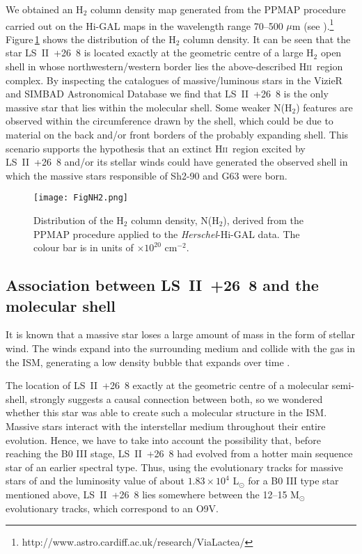 \documentclass[fleqn,usenatbib]{mnras}
\def\hii{H\textsc{ii}}
\begin{document}
We obtained an H$_{2}$ column density map generated from the PPMAP procedure carried out on the 
Hi-GAL maps in the wavelength range 70--500 $\mu$m (see 
\citealt{marsh17}).\footnote{http://www.astro.cardiff.ac.uk/research/ViaLactea/} 
Figure\,\ref{fig:NH2} shows the distribution of the H$_2$ column density. It can be
 seen that the star LS~II~+26~8 is located exactly at the geometric centre of a large 
H$_{2}$ open shell in whose northwestern/western border lies the above-described 
\hii~region complex. By inspecting the catalogues of massive/luminous stars in the 
VizieR and SIMBAD Astronomical Database we find that LS~II~+26~8 is the only massive 
star that lies within the molecular shell.
Some weaker N(H$_{2}$) features are observed within the circumference drawn by the 
shell, which could be due to material on the back and/or front borders of the 
probably expanding shell. This scenario supports the hypothesis that an extinct H\textsc{ii}~region excited 
by LS~II~+26~8 and/or its stellar winds could have generated the observed shell in 
which the massive stars responsible of Sh2-90 and G63 were born. 

\begin{figure}
    \centering
	\texttt{[image: FigNH2.png]}
    \caption{Distribution of the H$_2$ column density, N(H$_2$), derived from the 
PPMAP procedure applied to the {\it Herschel}-Hi-GAL data. The colour bar is in units
 of $\times10^{20}$ cm$^{-2}$.}
    \label{fig:NH2}
\end{figure}




\subsection{Association between LS~II~+26~8 and the molecular shell}

It is known that a massive star loses a large amount of mass in the form of stellar wind. 
The winds expand into the surrounding medium and collide with the gas in the ISM, 
generating a low density bubble that expands over time \citep{van15,mckee84}. 


The location of LS~II~+26~8 exactly at the geometric centre of a molecular 
semi-shell, strongly suggests a causal connection between both, so we wondered whether 
this star was able to create such a molecular structure in the ISM.
Massive stars interact with the interstellar medium throughout their entire evolution. 
Hence, we have to take into account the possibility that, before reaching the B0 III stage, LS~II~+26~8 had 
evolved from a hotter main sequence star of an earlier spectral type. 
Thus, using the evolutionary tracks for massive stars of \citet{eks12} and the luminosity 
value of about $1.83\times10^{4}$ L$_{\odot}$ for a B0 III type star mentioned above, 
LS~II~+26~8 lies somewhere between the 12--15 M$_{\odot}$ evolutionary tracks, which correspond to an O9V. 
\end{document}
